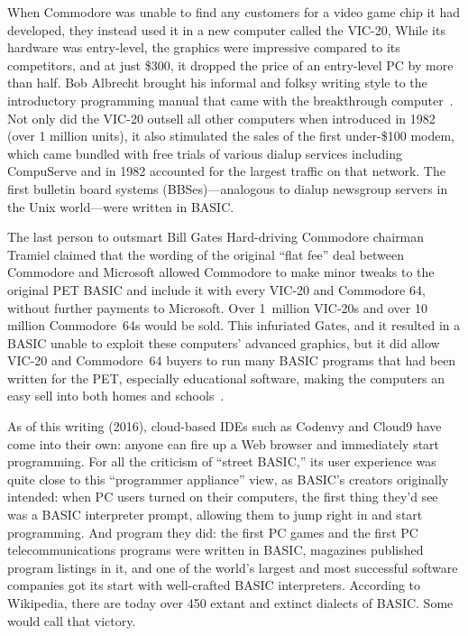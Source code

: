 When Commodore was unable to find any customers for a video game chip it
had developed, they instead used it in a new computer called the VIC-20,
While its hardware was entry-level, the graphics were impressive
compared to its competitors, and at just \$300, it dropped the price of
an entry-level PC by more than half.
Bob Albrecht brought his informal and folksy writing style to the
introductory programming manual that came with the breakthrough
computer~\cite{commodore}.
Not only did the VIC-20 outsell all other computers when introduced in
1982 (over 1 million units), it also stimulated the sales of the
first under-\$100 modem, which came bundled with free trials of various
dialup services including CompuServe and in 1982 accounted for the
largest traffic on that network.  The first bulletin board systems
(BBSes)---analogous to dialup newsgroup servers in the Unix world---were
written in BASIC.

\begin{tangent}{The last person to outsmart Bill Gates}
Hard-driving Commodore chairman Tramiel claimed that the wording of the
original ``flat fee'' deal between Commodore and Microsoft allowed
Commodore to make minor tweaks to the original PET BASIC and include it
with every VIC-20 and Commodore 64, without further payments to
Microsoft.
Over 1~million VIC-20s and over 10 million Commodore~64s would be sold.
This infuriated Gates, and it resulted in a BASIC unable to exploit
these computers' advanced graphics, but it did allow VIC-20 and
Commodore~64 buyers to run many BASIC programs that had been written
for the PET, especially educational software, making the computers an
easy sell into both homes and schools~\cite[p. 414]{commodore}.

\end{tangent}

As of this writing (2016), cloud-based IDEs such as Codenvy and Cloud9
have come into their own: anyone can fire up a Web browser and
immediately start programming.
For all the criticism of ``street BASIC,'' its user experience was quite
close to this ``programmer appliance'' view, as BASIC's creators
originally intended: when PC users turned on their computers, the first
thing they'd see was a BASIC interpreter prompt, allowing them to jump
right in and start programming.
And program they did: the first PC games and the first PC
telecommunications programs were written in BASIC, magazines published
program listings in it, and one of the world's largest and most
successful software companies got its start with well-crafted BASIC
interpreters.
According to Wikipedia, there are today over 450 extant and extinct
dialects of BASIC.
Some would call that victory.
